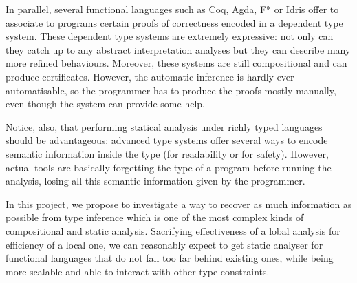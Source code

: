 \documentclass{article}[11pt]
\begin{document}
In parallel, several functional languages such as \href{https://coq.inria.fr/}{Coq}, \href{http://wiki.portal.chalmers.se/agda/pmwiki.php}{Agda}, \href{https://www.fstar-lang.org/}{F*} or \href{http://www.idris-lang.org/}{Idris} offer to associate to programs certain proofs of correctness encoded in a dependent type system. These dependent type systems are extremely expressive: not only can they catch up to any abstract interpretation analyses but they can describe many more refined behaviours. Moreover, these systems are still compositional and can produce certificates. However, the automatic inference is hardly ever automatisable, so the programmer has to produce the proofs mostly manually, even though the system can provide some help.

Notice, also, that performing statical analysis under richly typed languages should be advantageous:  advanced type systems offer several ways to encode semantic information inside the type (for readability or for safety). However, actual tools are basically forgetting the type of a program before running the analysis, losing all this semantic information given by the programmer.

In this project, we propose to investigate a way to recover as much information as possible from type inference which is one of the most complex kinds of compositional and static analysis. %
Sacrifying effectiveness of a lobal analysis for efficiency of a local one, we can reasonably expect to get static analyser for functional languages that do not fall too far behind existing ones, while being more scalable and able to interact with other type constraints.

\end{document}
